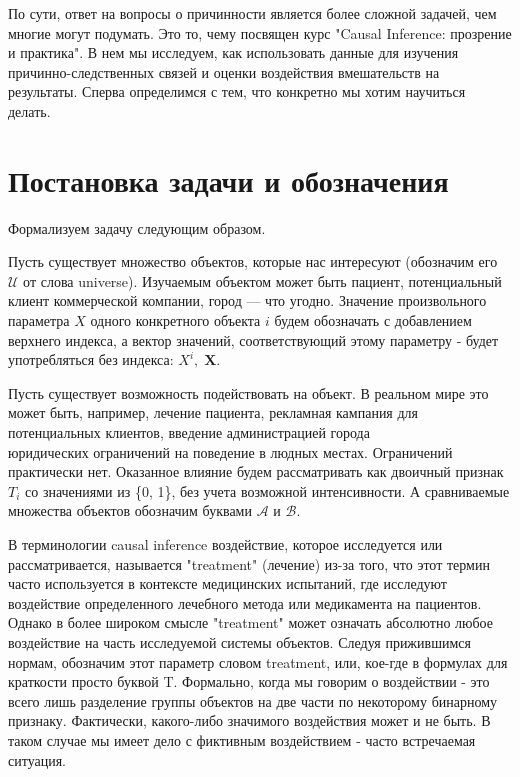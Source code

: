 \documentclass{article}
\newcommand{\coursename}{Causal Inference: прозрение и практика}
\begin{document}
        По сути, ответ на вопросы о причинности является более сложной задачей, чем многие могут подумать. Это то, чему посвящен курс "\coursename". В нем мы исследуем, как использовать данные для изучения причинно-следственных связей и оценки воздействия вмешательств на результаты. Сперва определимся с тем, что конкретно мы хотим научиться делать.

        \newpage

    \section*{Постановка задачи и обозначения}

        Формализуем задачу следующим образом.


        Пусть существует множество объектов, которые нас интересуют (обозначим его $\mathcal{U}$ от слова universe). Изучаемым объектом может быть пациент, потенциальный клиент коммерческой компании, город — что угодно. Значение произвольного параметра $X$ одного конкретного объекта $i$ будем обозначать с добавлением верхнего индекса, а вектор значений, соответствующий этому параметру - будет употребляться без индекса: $X^i,\; \mathbf{X}$.

        Пусть существует возможность подействовать на объект. В реальном мире это может быть, например, лечение пациента, рекламная кампания для потенциальных клиентов, введение администрацией города\\
        юридических ограничений на поведение в людных местах. Ограничений практически нет. Оказанное влияние будем рассматривать как двоичный признак $T_i$ со значениями из \{0, 1\}, без учета возможной интенсивности. А сравниваемые множества объектов обозначим буквами $\mathcal{A}$ и $\mathcal{B}$.

        В терминологии causal inference воздействие, которое исследуется или рассматривается, называется "treatment"{} (лечение) из-за того, что этот термин часто используется в контексте медицинских испытаний, где исследуют воздействие определенного лечебного метода или медикамента на пациентов. Однако в более широком смысле "treatment"{} может означать абсолютно любое воздействие на часть исследуемой системы объектов. Следуя прижившимся нормам, обозначим этот параметр словом treatment, или, кое-где в формулах для краткости просто буквой T. Формально, когда мы говорим о воздействии - это всего лишь разделение группы объектов на две части по некоторому бинарному признаку. Фактически, какого-либо значимого воздействия может и не быть. В таком случае мы имеет дело с фиктивным воздействием - часто встречаемая ситуация.
\end{document}
